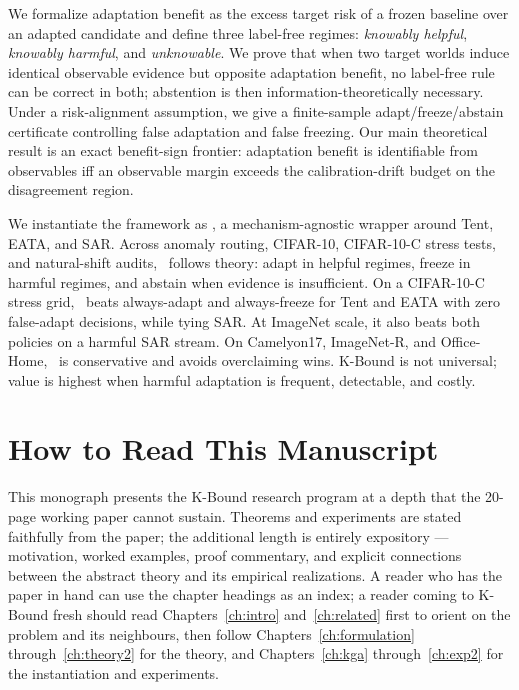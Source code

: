 We formalize adaptation benefit as the excess target risk of a frozen baseline over
an adapted candidate and define three label-free regimes: \emph{knowably helpful},
\emph{knowably harmful}, and \emph{unknowable}. We prove that when two target worlds
induce identical observable evidence but opposite adaptation benefit, no label-free
rule can be correct in both; abstention is then information-theoretically necessary.
Under a risk-alignment assumption, we give a finite-sample adapt/freeze/abstain
certificate controlling false adaptation and false freezing. Our main theoretical
result is an exact benefit-sign frontier: adaptation benefit is identifiable from
observables iff an observable margin exceeds the calibration-drift budget on the
disagreement region.

We instantiate the framework as \KGA, a mechanism-agnostic wrapper around Tent,
EATA, and SAR. Across anomaly routing, CIFAR-10, CIFAR-10-C stress tests, and
natural-shift audits, \KGA\ follows theory: adapt in helpful regimes, freeze in
harmful regimes, and abstain when evidence is insufficient. On a CIFAR-10-C stress
grid, \KGA\ beats always-adapt and always-freeze for Tent and EATA with zero
false-adapt decisions, while tying SAR. At ImageNet scale, it also beats both
policies on a harmful SAR stream. On Camelyon17, ImageNet-R, and Office-Home,
\KGA\ is conservative and avoids overclaiming wins. K-Bound is not universal; value
is highest when harmful adaptation is frequent, detectable, and costly.

\chapter*{How to Read This Manuscript}

This monograph presents the K-Bound research program at a depth that the
20-page working paper cannot sustain.
Theorems and experiments are stated faithfully from the paper; the additional
length is entirely expository --- motivation, worked examples, proof commentary,
and explicit connections between the abstract theory and its empirical realizations.
A reader who has the paper in hand can use the chapter headings as an index;
a reader coming to K-Bound fresh should read Chapters~\ref{ch:intro}
and~\ref{ch:related} first to orient on the problem and its neighbours, then
follow Chapters~\ref{ch:formulation} through~\ref{ch:theory2} for the theory,
and Chapters~\ref{ch:kga} through~\ref{ch:exp2} for the instantiation and
experiments.

